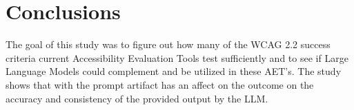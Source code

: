 \chapter{Conclusions\label{conclusions}}

The goal of this study was to figure out how many of the WCAG 2.2 success criteria current Accessibility Evaluation Tools test sufficiently and to see if Large Language Models could complement and be utilized in these AET's. The study shows that with the prompt artifact has an affect on the outcome on the accuracy and consistency of the provided output by the LLM. 


